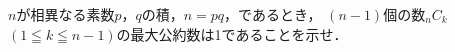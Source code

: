 \documentclass[../../main.tex]{subfiles}
\begin{document}
$n$が相異なる素数$p$，$q$の積，$n=pq$，であるとき，
$(n-1)$個の数$_nC_k$ $(1 \leqq k \leqq n-1)$の最大公約数は1であることを示せ．
\end{document}
